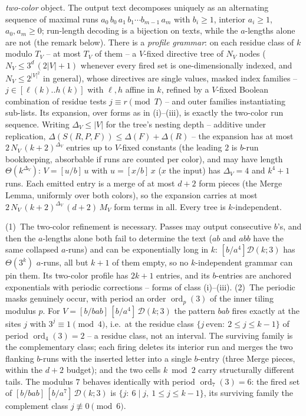 \documentclass[runningheads,envcountsect]{llncs}
\renewenvironment{remark}
  {\rmfamily\trivlist\item[\hskip\labelsep{\itshape Remark.}]\ignorespaces}
  {\endtrivlist}
\begin{document}
\begin{theorem}
\emph{two-color} object. The output text decomposes uniquely as an
alternating sequence of maximal runs
$a_0\,b_0\,a_1\,b_1\cdots b_{m-1}\,a_m$ with $b_i\ge1$, interior
$a_i\ge1$, $a_0,a_m\ge0$; run-length decoding is a bijection on
texts, while the $a$-lengths alone are not (the remark below).
There is a \emph{profile grammar}: on each residue class of $k$
modulo $T_V$ -- at most $T_V$ of them -- a $V$-fixed directive tree
of $N_V$ nodes ($N_V\le 3^{d}\,(2|V|+1)$ whenever every fired set
is one-dimensionally indexed, and $N_V\le 2^{|V|^{2}}$ in general),
whose directives are single values, masked index families -- $j\in[\ell(k)..h(k)]$
with $\ell,h$ affine in $k$, refined by a $V$-fixed Boolean
combination of residue tests $j\equiv r\pmod T$ -- and outer
families instantiating sub-lists. Its expansion, over forms as in
(i)--(iii), is exactly the two-color run sequence. Writing
$\Delta_V\le|V|$ for the tree's nesting depth -- additive under
replication, $\Delta(S(R,P,F))\le\Delta(F)+\Delta(R)$ -- the
expansion has at most $2\,N_V\,(k+2)^{\Delta_V}$ entries up to
$V$-fixed constants (the leading $2$ is $b$-run bookkeeping,
absorbable if runs are counted per color), and may have length
$\Theta(k^{\Delta_V})$: $V=[u/b]\,u$ with $u=[x/b]\,x$ ($x$ the
input) has $\Delta_V=4$ and $k^{4}+1$ runs. Each emitted entry is a
merge of at most $d+2$ form pieces (the Merge Lemma, uniformly over
both colors), so the expansion carries at most
$2\,N_V\,(k+2)^{\Delta_V}\,(d+2)\,M_V$ form terms in all. Every
tree is $k$-independent.
\end{theorem}

\begin{remark}
\label{rem:TLprof}
\textnormal{(1)~The two-color refinement is necessary. Passes may
output consecutive $b$'s, and then the $a$-lengths alone both fail
to determine the text ($ab$ and $abb$ have the same collapsed
$a$-runs) and can be exponentially long in $k$: $[b/a^4]\mathcal
D(k;3)$ has $\Theta(3^{k})$ $a$-runs, all but $k+1$ of them empty,
so no $k$-independent grammar can pin them. Its two-color profile
has $2k+1$ entries, and its $b$-entries are anchored exponentials
with periodic corrections -- forms of class (i)--(iii).
(2)~The periodic masks genuinely occur, with period an order
$\operatorname{ord}_p(3)$ of the inner tiling modulus $p$. For
$V=[b/\mathit{bab}]\,[b/a^4]\,\mathcal D(k;3)$ the pattern
$\mathit{bab}$ fires exactly at the sites $j$ with $3^j\equiv
1\pmod 4$, i.e.\ at the residue class $\{j\ \mathrm{even}:\
2\le j\le k-1\}$ of period $\operatorname{ord}_4(3)=2$ -- a residue
class, not an interval. The surviving family is the complementary
class; each firing deletes its interior run and merges the two
flanking $b$-runs with the inserted letter into a single $b$-entry
(three Merge pieces, within the $d+2$ budget); and the two cells
$k\bmod 2$ carry structurally different tails. The modulus $7$
behaves identically with period $\operatorname{ord}_7(3)=6$: the
fired set of $[b/\mathit{bab}]\,[b/a^{7}]\,\mathcal D(k;3)$ is
$\{j:\ 6\mid j,\ 1\le j\le k-1\}$, its surviving family the
complement class $j\not\equiv 0\pmod 6$.}
\end{remark}
\end{document}
